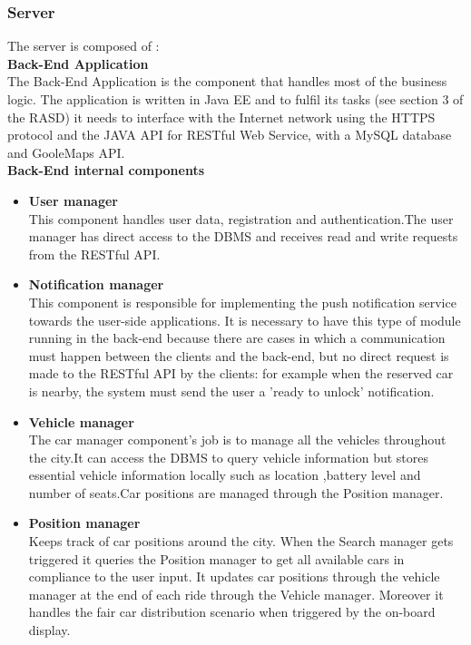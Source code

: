 \subsubsection{Server}
The server is composed of :\\[0.4in]
\textbf{Back-End Application}\\[0.1in]
The Back-End Application is the  component that handles most of the business logic.
The application is written in Java EE and to fulfil its tasks (see section
3 of the RASD) it needs to interface with the Internet network using
the HTTPS protocol and the JAVA API for RESTful Web Service, with a
MySQL database and GooleMaps API.\\[0.4in]
\textbf{Back-End internal components}\\[0.1in]
\begin{itemize}

\item \textbf{User manager}\\
This component handles user data, registration and authentication.The user manager has direct access to the DBMS and receives read and write requests from the RESTful API.

\item \textbf{Notification manager}\\
This component is responsible for implementing the push notification service towards
the user-side applications.
It is necessary to have this type of module running in the back-end because
there are cases in which a communication must happen between the clients and
the back-end, but no direct request is made to the RESTful API by the clients:
for example when the reserved car is nearby, the system must send the user a 'ready to unlock' notification.

\item \textbf{Vehicle manager}\\
The car manager component's job is to manage all the vehicles throughout the city.It can access the DBMS to query vehicle information but stores essential vehicle information locally such as location ,battery level and number of seats.Car positions
are managed through the Position manager.

\item \textbf{Position manager}\\
Keeps track of car positions around the city. When the Search manager gets triggered it queries the Position manager to get all available cars in compliance to the user input. It updates car positions through the vehicle manager at the end of each ride through the Vehicle manager. Moreover it handles the fair car distribution scenario when triggered by the on-board display. 


\end{itemize}
